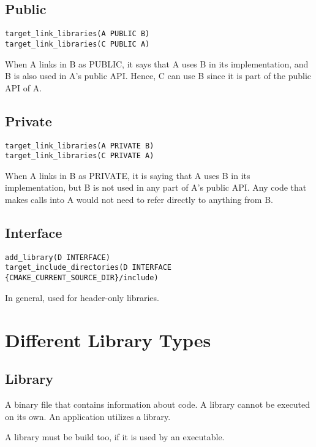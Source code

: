 \documentclass[openany]{report}
\begin{document}
\subsection{Public}

\begin{verbatim}
target_link_libraries(A PUBLIC B)
target_link_libraries(C PUBLIC A)
\end{verbatim}

When A links in B as PUBLIC, it says that A uses B in its implementation, and B is also used in A's public API. Hence, C can use B since it is part of the public API of A.

\subsection{Private}

\begin{verbatim}
target_link_libraries(A PRIVATE B)
target_link_libraries(C PRIVATE A)
\end{verbatim}


When A links in B as PRIVATE, it is saying that A uses B in its
implementation, but B is not used in any part of A's public API. Any code
that makes calls into A would not need to refer directly to anything from
B.

\subsection{Interface}

\begin{verbatim}
add_library(D INTERFACE)
target_include_directories(D INTERFACE {CMAKE_CURRENT_SOURCE_DIR}/include)
\end{verbatim}

In general, used for header-only libraries.

\section{Different Library Types}

\subsection{Library}

A binary file that contains information about code.
A library cannot be executed on its own.
An application utilizes a library.

A library must be build too, if it is used by an executable.
\end{document}
